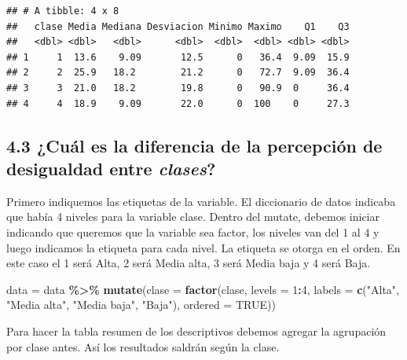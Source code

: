 \documentclass[
]{article}
\newenvironment{Shaded}{\begin{snugshade}}{\end{snugshade}}
\newcommand{\AttributeTok}[1]{\textcolor[rgb]{0.13,0.29,0.53}{#1}}
\newcommand{\ConstantTok}[1]{\textcolor[rgb]{0.56,0.35,0.01}{#1}}
\newcommand{\DecValTok}[1]{\textcolor[rgb]{0.00,0.00,0.81}{#1}}
\newcommand{\FunctionTok}[1]{\textcolor[rgb]{0.13,0.29,0.53}{\textbf{#1}}}
\newcommand{\NormalTok}[1]{#1}
\newcommand{\OtherTok}[1]{\textcolor[rgb]{0.56,0.35,0.01}{#1}}
\newcommand{\SpecialCharTok}[1]{\textcolor[rgb]{0.81,0.36,0.00}{\textbf{#1}}}
\newcommand{\StringTok}[1]{\textcolor[rgb]{0.31,0.60,0.02}{#1}}
\begin{document}
\begin{verbatim}
## # A tibble: 4 x 8
##   clase Media Mediana Desviacion Minimo Maximo    Q1    Q3
##   <dbl> <dbl>   <dbl>      <dbl>  <dbl>  <dbl> <dbl> <dbl>
## 1     1  13.6    9.09       12.5      0   36.4  9.09  15.9
## 2     2  25.9   18.2        21.2      0   72.7  9.09  36.4
## 3     3  21.0   18.2        19.8      0   90.9  0     36.4
## 4     4  18.9    9.09       22.0      0  100    0     27.3
\end{verbatim}

\hypertarget{cuuxe1l-es-la-diferencia-de-la-percepciuxf3n-de-desigualdad-entre-clases}{%
\subsection{\texorpdfstring{4.3 ¿Cuál es la diferencia de la percepción
de desigualdad entre
\emph{clases}?}{4.3 ¿Cuál es la diferencia de la percepción de desigualdad entre clases?}}\label{cuuxe1l-es-la-diferencia-de-la-percepciuxf3n-de-desigualdad-entre-clases}}

Primero indiquemos las etiquetas de la variable. El diccionario de datos
indicaba que había 4 niveles para la variable clase. Dentro del mutate,
debemos iniciar indicando que queremos que la variable sea factor, los
niveles van del 1 al 4 y luego indicamos la etiqueta para cada nivel. La
etiqueta se otorga en el orden. En este caso el 1 será Alta, 2 será
Media alta, 3 será Media baja y 4 será Baja.

\begin{Shaded}
\begin{Highlighting}[]
\NormalTok{data }\OtherTok{=}\NormalTok{ data }\SpecialCharTok{\%\textgreater{}\%}
 \FunctionTok{mutate}\NormalTok{(}\AttributeTok{clase =} \FunctionTok{factor}\NormalTok{(clase, }\AttributeTok{levels =} \DecValTok{1}\SpecialCharTok{:}\DecValTok{4}\NormalTok{, }\AttributeTok{labels =} \FunctionTok{c}\NormalTok{(}\StringTok{"Alta"}\NormalTok{, }\StringTok{"Media alta"}\NormalTok{, }\StringTok{"Media baja"}\NormalTok{, }\StringTok{"Baja"}\NormalTok{), }\AttributeTok{ordered =} \ConstantTok{TRUE}\NormalTok{))}
\end{Highlighting}
\end{Shaded}

Para hacer la tabla resumen de los descriptivos debemos agregar la
agrupación por clase antes. Así los resultados saldrán según la clase.
\end{document}
